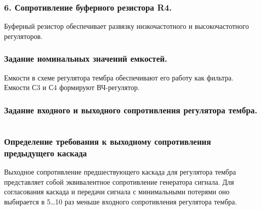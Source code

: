    \subsubsection{ 6. Сопротивление буферного  резистора R4.}
   Буферный резистор обеспечивает развязку  низкочастотного и высокочастотного регуляторов. 
   \begin{equation}
   \label{eq:equation5_8}
   
   \end{equation} 
   \subsubsection{    Задание номинальных значений емкостей.}
   Емкости в схеме регулятора тембра обеспечивают его работу как фильтра.
   \begin{equation}
   \label{eq:equation5_9}
   
   \end{equation} 
   \begin{equation}
   \label{eq:equation5_10}
   
   \end{equation} 
        Емкости С3 и С4 формируют ВЧ-регулятор.
        \begin{equation}
   \label{eq:equation5_11}
   
   \end{equation} 
  \begin{equation}
   \label{eq:equation5_12}
  
  \end{equation} 
\subsubsection{   Задание входного и выходного сопротивления регулятора тембра.   }
\begin{equation}
   \label{eq:equation5_13}

\end{equation} 
\begin{equation}
   \label{eq:equation5_14}
   
   \end{equation}

\subsubsection{ Определение требования к выходному сопротивления предыдущего каскада   }

\begin{equation}
   \label{eq:equation5_15}
   
\end{equation}
Выходное сопротивление предшествующего каскада для регулятора тембра представляет собой эквивалентное сопротивление генератора сигнала. Для согласования каскада и передачи сигнала с минимальными потерями оно выбирается в 5…10 раз меньше входного сопротивления регулятора тембра.

